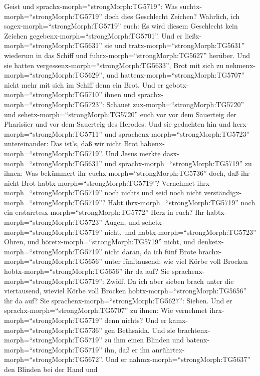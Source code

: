 Geist und sprachx-morph=``strongMorph:TG5719'': Was
suchtx-morph=``strongMorph:TG5719'' doch dies Geschlecht Zeichen?
Wahrlich, ich sagex-morph=``strongMorph:TG5719'' euch: Es wird diesem
Geschlecht kein Zeichen gegebenx-morph=``strongMorph:TG5701''.
 Und er ließx-morph=``strongMorph:TG5631'' sie und
tratx-morph=``strongMorph:TG5631'' wiederum in das Schiff und
fuhrx-morph=``strongMorph:TG5627'' herüber.  Und sie hatten
vergessenx-morph=``strongMorph:TG5633'', Brot mit sich zu
nehmenx-morph=``strongMorph:TG5629'', und
hattenx-morph=``strongMorph:TG5707'' nicht mehr mit sich im Schiff denn
ein Brot.  Und er gebotx-morph=``strongMorph:TG5710'' ihnen
und sprachx-morph=``strongMorph:TG5723'': Schauet
zux-morph=``strongMorph:TG5720'' und sehetx-morph=``strongMorph:TG5720''
euch vor vor dem Sauerteig der Pharisäer und vor dem Sauerteig des
Herodes.  Und sie gedachten hin und
herx-morph=``strongMorph:TG5711'' und
sprachenx-morph=``strongMorph:TG5723'' untereinander: Das ist's, daß wir
nicht Brot habenx-morph=``strongMorph:TG5719''.  Und Jesus
merkte dasx-morph=``strongMorph:TG5631'' und
sprachx-morph=``strongMorph:TG5719'' zu ihnen: Was bekümmert ihr
euchx-morph=``strongMorph:TG5736'' doch, daß ihr nicht Brot
habtx-morph=``strongMorph:TG5719''? Vernehmet
ihrx-morph=``strongMorph:TG5719'' noch nichts und seid noch nicht
verständigx-morph=``strongMorph:TG5719''? Habt
ihrx-morph=``strongMorph:TG5719'' noch ein
erstarrtesx-morph=``strongMorph:TG5772'' Herz in euch?  Ihr
habtx-morph=``strongMorph:TG5723'' Augen, und
sehetx-morph=``strongMorph:TG5719'' nicht, und
habtx-morph=``strongMorph:TG5723'' Ohren, und
höretx-morph=``strongMorph:TG5719'' nicht, und
denketx-morph=``strongMorph:TG5719'' nicht daran,  da ich
fünf Brote brachx-morph=``strongMorph:TG5656'' unter fünftausend: wie
viel Körbe voll Brocken hobtx-morph=``strongMorph:TG5656'' ihr da auf?
Sie sprachenx-morph=``strongMorph:TG5719'': Zwölf.  Da ich
aber sieben brach unter die viertausend, wieviel Körbe voll Brocken
hobtx-morph=``strongMorph:TG5656'' ihr da auf? Sie
sprachenx-morph=``strongMorph:TG5627'': Sieben.  Und er
sprachx-morph=``strongMorph:TG5707'' zu ihnen: Wie vernehmet
ihrx-morph=``strongMorph:TG5719'' denn nichts?  Und er
kamx-morph=``strongMorph:TG5736'' gen Bethsaida. Und sie
brachtenx-morph=``strongMorph:TG5719'' zu ihm einen Blinden und
batenx-morph=``strongMorph:TG5719'' ihn, daß er ihn
anrührtex-morph=``strongMorph:TG5672''.  Und er
nahmx-morph=``strongMorph:TG5637'' den Blinden bei der Hand und
